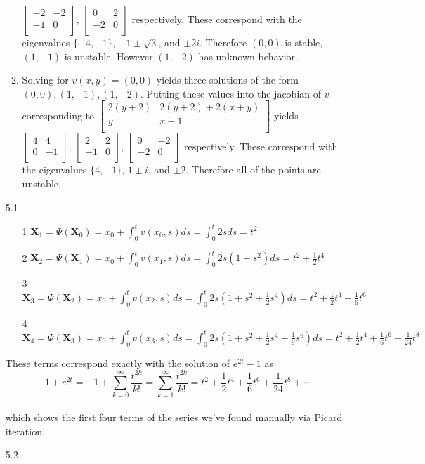 \documentclass[12pt, letterpaper]{article}
\begin{document}
\begin{enumerate}
\begin{enumerate}
	$\begin{bmatrix} -2 & -2 \\ -1 & 0 \\ \end{bmatrix}$, $\begin{bmatrix} 0 & 2 \\ -2 & 0 \\ \end{bmatrix}$ respectively.  These correspond with the eigenvalues $\{-4,-1\}$, $-1\pm \sqrt{3}$, and $\pm 2i$.  Therefore $(0,0)$ is stable, $(1,-1)$ is unstable.  However $(1,-2)$ has unknown behavior.  
			\item  Solving for $v(x,y) = (0,0)$ yields three solutions of the form $(0,0), (1,-1), (1,-2)$.  Putting these values into the jacobian of $v$ corresponding to $\begin{bmatrix} 2 (y+2) & 2 (y+2) + 2 (x+y) \\ y & x-1 \\ \end{bmatrix}$ yields  
			$\begin{bmatrix}  4 & 4 \\ 0 & -1 \\\end{bmatrix}$,	$\begin{bmatrix} 2 & 2 \\ -1 & 0 \\ \end{bmatrix}$, 
			$\begin{bmatrix} 0 & -2 \\ -2 & 0 \\ \end{bmatrix}$ respectively.   These correspond with the eigenvalues $\{4,-1\}$, $1\pm i$, and $\pm 2$.  Therefore all of the points are unstable.  
		\end{enumerate}				
		\item[5.1] 
		\begin{enumerate}
			\item[1] $\textbf{X}_1 = \Psi(\textbf{X}_0) = x_0 + \int_0^t v(x_0,s)ds = \int_0^t 2s ds = t^2$
			\item[2] $\textbf{X}_2 = \Psi(\textbf{X}_1) = x_0 + \int_0^t v(x_1,s)ds = \int_0^t 2s(1+s^2) ds = t^2 + \frac{1}{2}t^4$
			\item[3] $\textbf{X}_3 = \Psi(\textbf{X}_2) = x_0 + \int_0^t v(x_2,s)ds = \int_0^t 2s(1+s^2 + \frac{1}{2}s^4) ds = t^2 + \frac{1}{2}t^4 + \frac{1}{6} t^6$
			\item[4] $\textbf{X}_4 = \Psi(\textbf{X}_3) = x_0 + \int_0^t v(x_3,s)ds = \int_0^t 2s(1+s^2 + \frac{1}{2}s^4 + \frac{1}{6} s^6) ds = t^2 + \frac{1}{2}t^4 + \frac{1}{6} t^6 + \frac{1}{24} t^8$
		\end{enumerate}
		These terms correspond exactly with the solution of $e^{2t} -1$ as 
		$$ -1 + e^{2t} = -1 + \sum_{k=0}^\infty \frac{t^{2k}}{k!} = \sum_{k=1}^\infty \frac{t^{2k}}{k!} = t^2 + \frac{1}{2}t^4 + \frac{1}{6} t^6 + \frac{1}{24} t^8 + \cdots $$\\
		which shows the first four terms of the series we've found manually via Picard iteration.
		\item[5.2]
	\end{enumerate}
\end{document}
